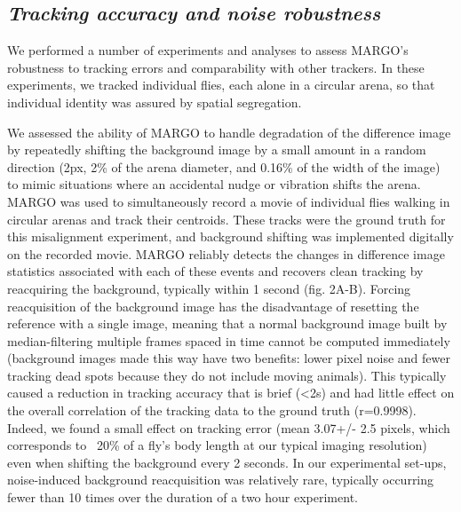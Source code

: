\documentclass[12pt,letterpaper]{article}
\begin{document}
\subsection*{\textit{Tracking accuracy and noise robustness}}

We performed a number of experiments and analyses to assess MARGO's robustness to tracking errors and comparability with other trackers. In these experiments, we tracked individual flies, each alone in a circular arena, so that individual identity was assured by spatial segregation.

We assessed the ability of MARGO to handle degradation of the difference image by repeatedly shifting the background image by a small amount in a random direction (2px, 2\% of the arena diameter, and 0.16\% of the width of the image) to mimic situations where an accidental nudge or vibration shifts the arena. MARGO was used to simultaneously record a movie of individual flies walking in circular arenas and track their centroids. These tracks were the ground truth for this misalignment experiment, and background shifting was implemented digitally on the recorded movie. MARGO reliably detects the changes in difference image statistics associated with each of these events and recovers clean tracking by reacquiring the background, typically within 1 second (fig. 2A-B). Forcing reacquisition of the background image has the disadvantage of resetting the reference with a single image, meaning that a normal background image built by median-filtering multiple frames spaced in time cannot be computed immediately (background images made this way have two benefits: lower pixel noise and fewer tracking dead spots because they do not include moving animals). This typically caused a reduction in tracking accuracy that is brief (<2s) and had little effect on the overall correlation of the tracking data to the ground truth (r=0.9998). Indeed, we found a small effect on tracking error (mean 3.07+/- 2.5 pixels, which corresponds to ~20\% of a fly's body length at our typical imaging resolution) even when shifting the background every 2 seconds. In our experimental set-ups, noise-induced background reacquisition was relatively rare, typically occurring fewer than 10 times over the duration of a two hour experiment.
\end{document}
